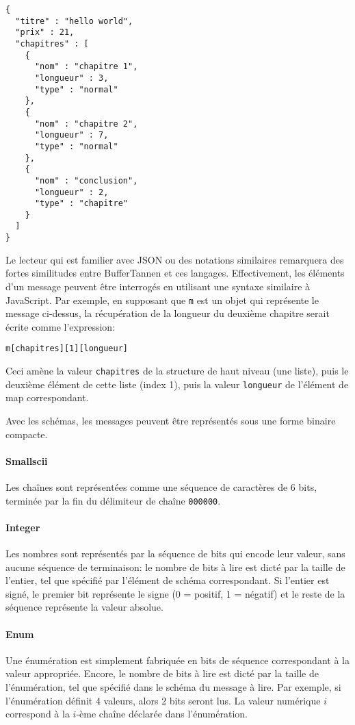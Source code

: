 \begin{verbatim}
{
  "titre" : "hello world",
  "prix" : 21,
  "chapitres" : [
    {
      "nom" : "chapitre 1",
      "longueur" : 3,
      "type" : "normal"
    },
    {
      "nom" : "chapitre 2",
      "longueur" : 7,
      "type" : "normal"
    },
    {
      "nom" : "conclusion",
      "longueur" : 2,
      "type" : "chapitre"
    }
  ]
}
\end{verbatim}

Le lecteur qui est familier avec JSON ou des notations similaires remarquera des fortes similitudes entre BufferTannen et ces langages. Effectivement, les éléments d'un message peuvent être interrogés en utilisant une syntaxe similaire à JavaScript. Par exemple, en supposant que \verb+m+ est un objet qui représente le message ci-dessus, la récupération de la longueur du deuxième chapitre serait écrite comme l'expression:

\begin{verbatim}
m[chapitres][1][longueur]
\end{verbatim}

Ceci amène la valeur \verb+chapitres+ de la structure de haut niveau (une liste), puis le deuxième élément de cette liste (index 1), puis la valeur \verb+longueur+ de l'élément de map correspondant.

Avec les schémas, les messages peuvent être représentés sous une forme binaire compacte.

\paragraph{Smallscii} Les chaînes sont représentées comme une séquence de caractères de 6 bits, terminée par la fin du délimiteur de chaîne \verb+000000+.

\paragraph{Integer} Les nombres sont représentés par la séquence de bits qui encode leur valeur, sans aucune séquence de terminaison: le nombre de bits à lire est dicté par la taille de l'entier, tel que spécifié par l'élément de schéma correspondant. Si l'entier est signé, le premier bit représente le signe (0 = positif, 1 = négatif) et le reste de la séquence représente la valeur absolue.

\paragraph{Enum} Une énumération est simplement fabriquée en bits de séquence correspondant à la valeur appropriée. Encore, le nombre de bits à lire est dicté par la taille de l'énumération, tel que spécifié dans le schéma du message à lire. Par exemple, si l'énumération définit 4 valeurs, alors 2 bits seront lus. La valeur numérique $i$ correspond à la $i$-ème chaîne déclarée dans l'énumération.

